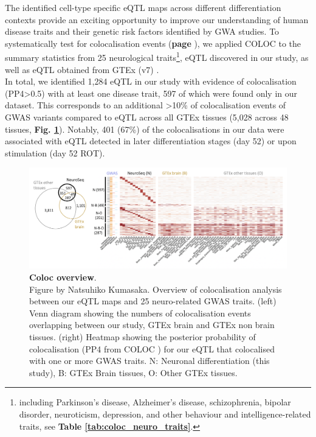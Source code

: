The identified cell-type specific eQTL maps across different differentiation contexts provide an exciting opportunity to improve our understanding of human disease traits and their genetic risk factors identified by GWA studies.
To systematically test for colocalisation events (\textbf{page \pageref{sec:eqtl_gwas}}), we applied COLOC \cite{giambartolomei2014bayesian} to the summary statistics from 25 neurological traits\footnote{including Parkinson's disease, Alzheimer's disease, schizophrenia, bipolar disorder, neuroticism, depression, and other behaviour and intelligence-related traits, see \textbf{Table \ref{tab:coloc_neuro_traits}}.}, eQTL discovered in our study, as well as eQTL obtained from GTEx (v7) \cite{gtex2017genetic}.\\

In total, we identified 1,284 eQTL in our study with evidence of colocalisation (PP4>0.5) with at least one disease trait, 597 of which were found only in our dataset. 
This corresponds to an additional >10\% of colocalisation events of GWAS variants compared to eQTL across all GTEx tissues (5,028 across 48 tissues, \textbf{Fig. \ref{fig:neuroseq_coloc_overview}}). 
Notably, 401 (67\%) of the colocalisations in our data were associated with eQTL detected in later differentiation stages (day 52) or upon stimulation (day 52 ROT).\\

\begin{figure}[h]
\centering
\includegraphics[width=16cm]{Chapter5/Fig/neuroseq_coloc_overview.png}
\caption[Coloc overview]{\textbf{Coloc overview}.\\
Figure by Natsuhiko Kumasaka.
Overview of colocalisation analysis between our eQTL maps and 25 neuro-related GWAS traits. 
(left) Venn diagram showing the numbers of colocalisation events overlapping between our study, GTEx brain and GTEx non brain tissues. 
(right) Heatmap showing the posterior probability of colocalisation (PP4 from COLOC \cite{giambartolomei2014bayesian}) for our eQTL that colocalised with one or more GWAS traits. 
N: Neuronal differentiation (this study), B: GTEx Brain tissues, O: Other GTEx tissues.}
\label{fig:neuroseq_coloc_overview}
\end{figure}

